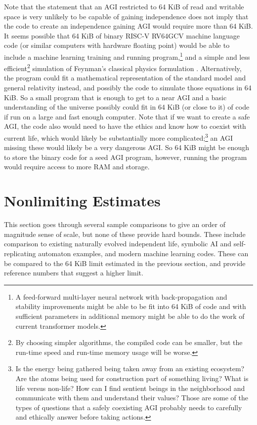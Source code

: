 \documentclass[letterpaper,twocolumn]{article}
\begin{document}
Note that the statement that an AGI restricted to 64 KiB of read and
writable space is very unlikely to be capable of gaining independence
does not imply that the code to create an independence gaining AGI
would require more than 64 KiB.  It seems possible that 64 KiB of
binary RISC-V RV64GCV machine language code (or similar computers with
hardware floating point) would be able to include a machine learning
training and running program,\footnote{A feed-forward multi-layer
neural network with back-propagation and stability improvements might
be able to be fit into 64 KiB of code and with sufficient parameters
in additional memory might be able to do the work of current
transformer models.} and a simple and less efficient\footnote{By
choosing simpler algorithms, the compiled code can be smaller, but the
run-time speed and run-time memory usage will be worse.} simulation of
Feynman's classical physics formulation \citep[Vol.~2 Table
  18-4]{feynmanphysics}. Alternatively, the program could fit a
mathematical representation of the standard model and general
relativity instead, and possibly the code to simulate those equations
in 64 KiB. So a small program that is enough to get to a near AGI and
a basic understanding of the universe possibly could fit in 64 KiB (or
close to it) of code if run on a large and fast enough computer. Note
that if we want to create a safe AGI, the code also would need to have
the ethics and know how to coexist with current life, which would
likely be substantially more complicated;\footnote{Is the energy being
gathered being taken away from an existing ecosystem?  Are the atoms
being used for construction part of something living?  What is life
versus non-life? How can I find sentient beings in the neighborhood
and communicate with them and understand their values?  Those are some
of the types of questions that a safely coexisting AGI probably needs
to carefully and ethically answer before taking actions.} an AGI
missing these would likely be a very dangerous AGI. So 64 KiB might be
enough to store the binary code for a seed AGI program, however,
running the program would require access to more RAM and storage.

\section{Nonlimiting Estimates}
\label{nonlimitingestsec}

This section goes through several sample comparisons to give an order
of magnitude sense of scale, but none of these provide hard
bounds. These include comparison to existing naturally evolved
independent life, symbolic AI and self-replicating automaton examples,
and modern machine learning codes.  These can be compared to the 64
KiB limit estimated in the previous section, and provide reference
numbers that suggest a higher limit.
\end{document}
